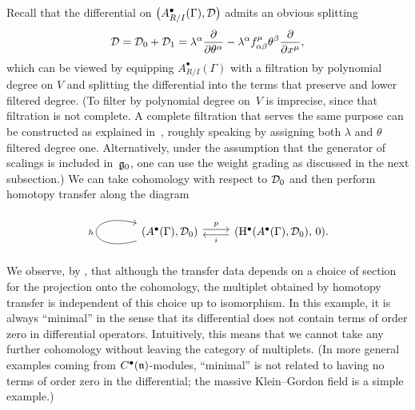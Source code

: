 \documentclass[11pt]{article}
\numberwithin{equation}{section}
\numberwithin{equation}{section}
\def\bu{\bullet}
\begin{document}
Recall that the differential on $\big(A^\bullet_{R/I} (\Gamma),\mathcal D\big)$ admits an obvious splitting
\begin{equation*}
\mathcal D = \mathcal D_0 + \mathcal D_1 = \lambda^\alpha \frac{\partial}{\partial \theta^\alpha} - \lambda^\alpha f^\mu_{\alpha \beta} \theta^\beta \frac{\partial}{\partial x^\mu} ,
\end{equation*}
which can be viewed by equipping $A^\bullet_{R/I}(\Gamma)$ with a filtration by polynomial degree on $V$ and splitting the differential into the terms that preserve and lower filtered degree.
(To filter by polynomial degree on~$V$ is imprecise, since that filtration is not complete. A complete filtration that serves the same purpose can be constructed as explained in~\cite{perspectives}, roughly speaking by assigning both $\lambda$ and $\theta$ filtered degree one. Alternatively, under the assumption that the generator of scalings is included in~$\mathfrak g_0$, one can use the weight grading as discussed in the next subsection.)
We can take cohomology with respect to $\mathcal D_0$ and then perform homotopy transfer along the diagram
\begin{equation*}
\begin{tikzcd}
\arrow[loop left]{l}{h}(A^\bullet (\Gamma) , \cD_0)\arrow[r, shift left, "p"] &(\mathrm H^\bullet(A^\bullet(\Gamma), \cD_0) , \, 0)\arrow[l, shift left, "i"] .
\end{tikzcd}
\end{equation*}
We observe, by \cite[Theorem 10.3.15]{LodayVallette}, that although the transfer data depends on a choice of section for the projection onto the cohomology, the multiplet obtained by homotopy transfer is independent of this choice up to isomorphism. In this example, it is always ``minimal'' in the sense that its differential does not contain terms of order zero in differential operators.
Intuitively, this means that we cannot take any further cohomology without leaving the category of multiplets. (In more general examples coming from $C^\bu(\fn)$-modules, ``minimal'' is not related to having no terms of order zero in the differential; the massive Klein--Gordon field is a simple example.)
\end{document}
